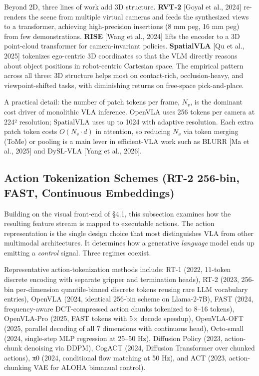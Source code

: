 Beyond 2D, three lines of work add 3D structure. \textbf{RVT-2} {[}Goyal et al., 2024{]} re-renders the scene from multiple virtual cameras and feeds the synthesized views to a transformer, achieving high-precision insertions (8 mm peg, 16 mm peg) from few demonstrations. \textbf{RISE} {[}Wang et al., 2024{]} lifts the encoder to a 3D point-cloud transformer for camera-invariant policies. \textbf{SpatialVLA} {[}Qu et al., 2025{]} tokenizes ego-centric 3D coordinates so that the VLM directly reasons about object positions in robot-centric Cartesian space. The empirical pattern across all three: 3D structure helps most on contact-rich, occlusion-heavy, and viewpoint-shifted tasks, with diminishing returns on free-space pick-and-place.

A practical detail: the number of patch tokens per frame, \(N_v\), is the dominant cost driver of monolithic VLA inference. OpenVLA uses 256 tokens per camera at 224² resolution; SpatialVLA uses up to 1024 with adaptive resolution. Each extra patch token costs \(O(N_v \cdot d)\) in attention, so reducing \(N_v\) via token merging (ToMe) or pooling is a main lever in efficient-VLA work such as BLURR {[}Ma et al., 2025{]} and DySL-VLA {[}Yang et al., 2026{]}.

\subsection{Action Tokenization Schemes (RT-2 256-bin, FAST, Continuous Embeddings)}\label{action-tokenization-schemes-rt-2-256-bin-fast-continuous-embeddings}

Building on the visual front-end of §4.1, this subsection examines how the resulting feature stream is mapped to executable actions. The action representation is the single design choice that most distinguishes VLA from other multimodal architectures. It determines how a generative \emph{language} model ends up emitting a \emph{control} signal. Three regimes coexist.

Representative action-tokenization methods include: RT-1 (2022, 11-token discrete encoding with separate gripper and termination heads), RT-2 (2023, 256-bin per-dimension quantile-binned discrete tokens reusing rare LLM vocabulary entries), OpenVLA (2024, identical 256-bin scheme on Llama-2-7B), FAST (2024, frequency-aware DCT-compressed action chunks tokenized to 8--16 tokens), OpenVLA-Pro (2025, FAST tokens with 5× decode speedup), OpenVLA-OFT (2025, parallel decoding of all 7 dimensions with continuous head), Octo-small (2024, single-step MLP regression at 25--50 Hz), Diffusion Policy (2023, action-chunk denoising via DDPM), CogACT (2024, Diffusion Transformer over chunked actions), π0 (2024, conditional flow matching at 50 Hz), and ACT (2023, action-chunking VAE for ALOHA bimanual control).

